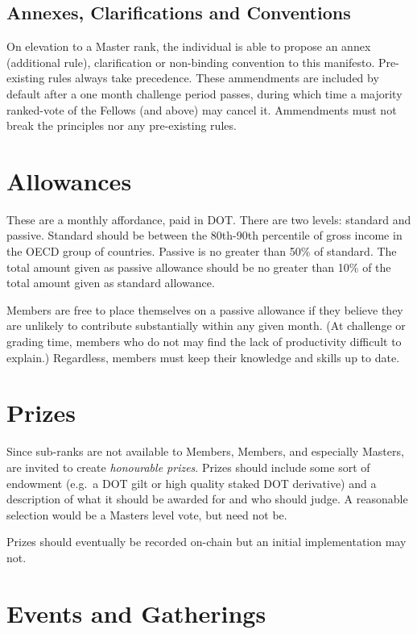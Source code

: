 \documentclass[9pt,oneside]{amsart}
\begin{document}
\subsection{Annexes, Clarifications and Conventions}\label{annexes-clarifications-and-conventions}

On elevation to a Master rank, the individual is able to propose an annex (additional rule), clarification or non-binding convention to this manifesto. Pre-existing rules always take precedence. These ammendments are included by default after a one month challenge period passes, during which time a majority ranked-vote of the Fellows (and above) may cancel it. Ammendments must not break the principles nor any pre-existing rules.

\section{Allowances}\label{allowances}

These are a monthly affordance, paid in DOT. There are two levels: standard and passive. Standard should be between the 80th-90th percentile of gross income in the OECD group of countries. Passive is no greater than 50\% of standard. The total amount given as passive allowance should be no greater than 10\% of the total amount given as standard allowance.

Members are free to place themselves on a passive allowance if they believe they are unlikely to contribute substantially within any given month. (At challenge or grading time, members who do not may find the lack of productivity difficult to explain.) Regardless, members must keep their knowledge and skills up to date.

\section{Prizes}\label{prizes}

Since sub-ranks are not available to Members, Members, and especially Masters, are invited to create \emph{honourable prizes}. Prizes should include some sort of endowment (e.g.~a DOT gilt or high quality staked DOT derivative) and a description of what it should be awarded for and who should judge. A reasonable selection would be a Masters level vote, but need not be.

Prizes should eventually be recorded on-chain but an initial implementation may not.

\section{Events and Gatherings}\label{events-and-gatherings}
\end{document}
